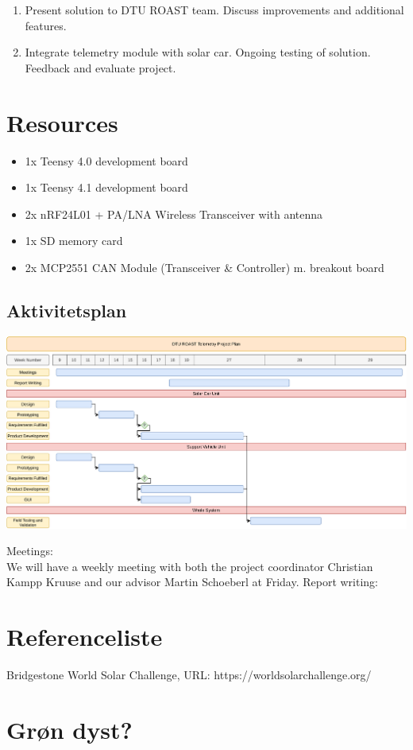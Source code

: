 \documentclass[]{article}
\begin{document}
\begin{enumerate}
    \item Present solution to DTU ROAST team. Discuss improvements and additional features. 
    \item Integrate telemetry module with solar car. Ongoing testing of solution. Feedback and evaluate project. 
\end{enumerate}
\section{Resources}
\begin{itemize}
    \item 1x Teensy 4.0 development board
    \item 1x Teensy 4.1 development board
    \item 2x nRF24L01 + PA/LNA Wireless Transceiver with antenna
    \item 1x SD memory card
    \item 2x MCP2551 CAN Module (Transceiver & Controller) m. breakout board
\end{itemize}
\begin{landscape}
\section{Aktivitetsplan}
\hspace{1.5cm}\includegraphics[width=1.45\textwidth]{documentation/images/projectPlan.pdf}
\end{landscape}
Meetings:\\
We will have a weekly meeting with both the project coordinator Christian Kampp Kruuse and our advisor Martin Schoeberl at Friday.
Report writing:\\

\section{Referenceliste}
\begin{thebibliography}{9}
Bridgestone World Solar Challenge, 
URL: https://worldsolarchallenge.org/
\end{thebibliography}
\section{Grøn dyst?}
\end{document}
